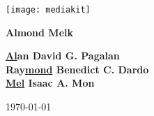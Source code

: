 \begin{titlepage}
	\begin{center}
	\texttt{[image: mediakit]}\\
	\vspace{30pt}

	\textbf{\Huge Almond Melk}\\
	\vfill

	\textbf{\underline{Al}an David G. Pagalan\\
	Ray\underline{mond} Benedict C. Dardo\\
	\underline{Mel} Isaac A. Mon
	}\\
	\vspace{30pt}

	\today
	\end{center}
\end{titlepage}